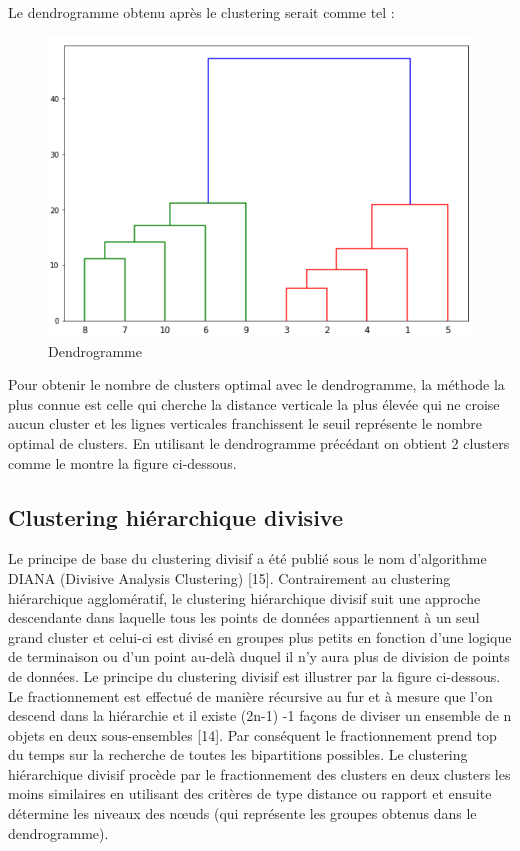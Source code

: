 Le dendrogramme obtenu après le clustering serait comme tel :
\begin{figure}[H]
	\begin{center}
		\includegraphics[width=\textwidth]{images/chapitre6/dendrogram.png}
	\end{center}
	\caption{Dendrogramme}
	\label{dendrogramme}
\end{figure}

Pour obtenir le nombre de clusters optimal avec le dendrogramme, la méthode la plus connue est celle qui cherche la distance verticale la plus élevée qui ne croise aucun cluster et les lignes verticales franchissent le seuil représente le nombre optimal de clusters. En utilisant le dendrogramme précédant on obtient 2 clusters comme le montre la figure ci-dessous.

\subsection{Clustering hiérarchique divisive}
Le principe de base du clustering divisif a été publié sous le nom d'algorithme DIANA (Divisive Analysis Clustering) [15]. Contrairement au clustering hiérarchique agglomératif, le clustering hiérarchique divisif suit une approche descendante dans laquelle tous les points de données appartiennent à un seul grand cluster et celui-ci est divisé en groupes plus petits en fonction d'une logique de terminaison ou d'un point au-delà duquel il n'y aura plus de division de points de données. Le principe du clustering divisif est illustrer par la figure ci-dessous. \\
Le fractionnement est effectué de manière récursive au fur et à mesure que l'on descend dans la hiérarchie et il existe (2n-1) -1  façons de diviser un ensemble de n objets en deux sous-ensembles [14]. Par conséquent le fractionnement prend top du temps sur la recherche de toutes les bipartitions possibles. Le clustering hiérarchique divisif procède par le fractionnement des clusters en deux clusters les moins similaires en utilisant des critères de type distance ou rapport et ensuite détermine les niveaux des nœuds (qui représente les groupes obtenus dans le dendrogramme).
